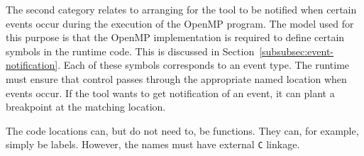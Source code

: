 The second category relates to arranging for the tool to be notified
when certain events occur during the execution of the OpenMP program.
The model used for this purpose is that the OpenMP implementation
is required to define certain symbols in the runtime code.
This is discussed in Section~\ref{subsubsec:event-notification}.
Each of these symbols corresponds to an event type.
The runtime must ensure that control passes through the appropriate
named location when events occur.
If the tool wants to get notification of an event, it can plant
a breakpoint at the matching location.

The code locations can, but do not need to, be functions.
They can, for example, simply be labels.
However, the names must have external \texttt{C} linkage.

